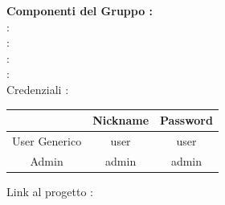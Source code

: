 \documentclass[11pt, a4paper,table]{article}
\begin{document}
\begin{center}
		\vspace{2em}
		\textbf{Componenti del Gruppo :}
		\vspace{0.5em}
		\\ \Tber : \MatT
		\vspace{0.5em}
		\\ \Mspa : \MatM
		\vspace{0.5em}
		\\ \Plau : \MatP
		\vspace{0.5em}
		\\ \Amat : \MatA
    \vspace{0.5em}
    \\ Credenziali :
    \begin{center}
      \begin{tabular}{ |c|c|c| } 
      \hline
      & Nickname & Password \\
      \hline
      User Generico & user & user\\ 
      \hline
      Admin & admin & admin \\ 
      \hline
      \end{tabular}
    \end{center}
    \vspace{0.5em}
    Link al progetto : 

    
	\end{center}

  \newpage
  \tableofcontents
  \raggedright 
	\newpage
	
	
	\newpage
	
	
  \newpage
	
	
  
  
	
  
\end{document}
